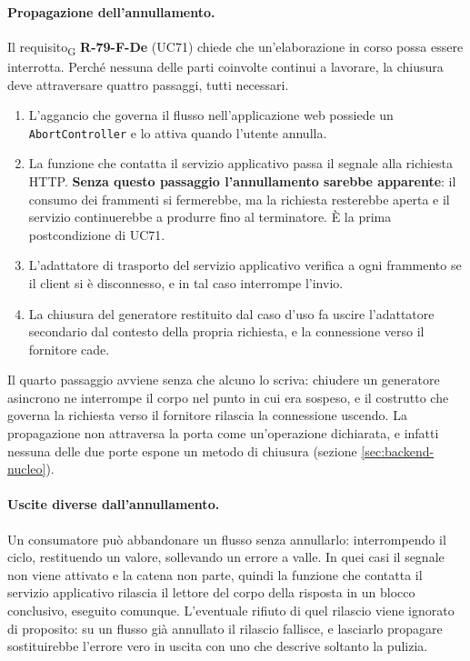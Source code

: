 \documentclass[a4paper, 10pt]{article}
\begin{document}
\paragraph{Propagazione dell'annullamento.}
Il requisito\textsubscript{G} \textbf{R-79-F-De} (UC71) chiede che un'elaborazione in corso possa essere interrotta. Perché nessuna delle parti coinvolte continui a lavorare, la chiusura deve attraversare quattro passaggi, tutti necessari.

\begin{enumerate}
    \setlength{\itemsep}{3pt}
    \item L'aggancio che governa il flusso nell'applicazione web possiede un \texttt{AbortController} e lo attiva quando l'utente annulla.
    \item La funzione che contatta il servizio applicativo passa il segnale alla richiesta HTTP. \textbf{Senza questo passaggio l'annullamento sarebbe apparente}: il consumo dei frammenti si fermerebbe, ma la richiesta resterebbe aperta e il servizio continuerebbe a produrre fino al terminatore. È la prima postcondizione di UC71.
    \item L'adattatore di trasporto del servizio applicativo verifica a ogni frammento se il client si è disconnesso, e in tal caso interrompe l'invio.
    \item La chiusura del generatore restituito dal caso d'uso fa uscire l'adattatore secondario dal contesto della propria richiesta, e la connessione verso il fornitore cade.
\end{enumerate}

\noindent Il quarto passaggio avviene senza che alcuno lo scriva: chiudere un generatore asincrono ne interrompe il corpo nel punto in cui era sospeso, e il costrutto che governa la richiesta verso il fornitore rilascia la connessione uscendo. La propagazione non attraversa la porta come un'operazione dichiarata, e infatti nessuna delle due porte espone un metodo di chiusura (sezione \ref{sec:backend-nucleo}).

\paragraph{Uscite diverse dall'annullamento.}
Un consumatore può abbandonare un flusso senza annullarlo: interrompendo il ciclo, restituendo un valore, sollevando un errore a valle. In quei casi il segnale non viene attivato e la catena non parte, quindi la funzione che contatta il servizio applicativo rilascia il lettore del corpo della risposta in un blocco conclusivo, eseguito comunque. L'eventuale rifiuto di quel rilascio viene ignorato di proposito: su un flusso già annullato il rilascio fallisce, e lasciarlo propagare sostituirebbe l'errore vero in uscita con uno che descrive soltanto la pulizia.
\end{document}
